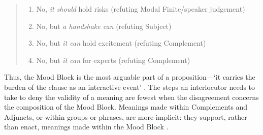                         \begin{quote}
                        \small
                        \begin{enumerate}	\setlength\itemsep{-0.5em}
		\item No, \emph{it should} hold risks (refuting Modal Finite/speaker judgement)
		\item No, but \emph{a handshake can} (refuting Subject)
		\item No, but \emph{it can} hold excitement (refuting Complement)
		\item No, but \emph{it can} for experts (refuting Complement)
                        \end{enumerate}
                        \end{quote}
		Thus, the Mood Block is the most arguable part of a proposition---`it carries the burden of the clause as an interactive event' \cite[p.~118]{halliday_introduction_2004}. The steps an interlocutor needs to take to deny the validity of a meaning are fewest when the disagreement concerns the composition of the Mood Block. Meanings made within Complements and Adjuncts, or within groups or phrases, are more implicit: they support, rather than enact, meanings made within the Mood Block \cite{matthiessen_combining_2002}.



